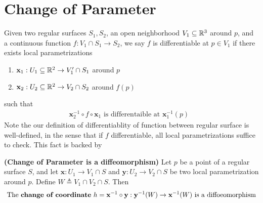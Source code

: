 \documentclass{report}
\begin{document}
\section{Change of Parameter}
\begin{mdframed}
Given two regular surfaces $S_1,S_2$, an open neighborhood $V_1\subseteq \mathbb{R}^3$ around $p$, and a continuous function  $f:V_1\cap S_1\rightarrow S_2$, we say $f$ is differentiable at $p\in V_1$ if there exists local parametrizations 
\begin{enumerate}[label=(\alph*)]
  \item $\textbf{x}_1:U_1\subseteq \mathbb{R}^2\rightarrow V_1'\cap S_1$ around $p$
  \item $\textbf{x}_2:U_2\subseteq \mathbb{R}^2 \rightarrow V_2\cap  S_2$ around $f(p)$
\end{enumerate}
such that 
\begin{align*}
\textbf{x}_2^{-1}\circ f \circ \textbf{x}_1\text{ is differentaible at $\textbf{x}_1^{-1}(p)$ }
\end{align*}
Note the our definition of differentiablity of function between regular surface is well-defined, in the sense that if $f$ differentiable, all local parametrizations suffice to check. This fact is backed by  
\end{mdframed}
\begin{theorem}
\label{CoP}
\textbf{(Change of Parameter is a diffeomorphism)} Let $p$ be a point of a regular surface $S$, and let $\textbf{x}:U_1\rightarrow V_1\cap S$ and $\textbf{y}:U_2\rightarrow V_2\cap S$ be two local parametrization around $p$. Define $W\triangleq V_1\cap V_2 \cap S$. Then 
\begin{align*}
  \text{ The \textbf{change of coordinate} $h=\textbf{x}^{-1}\circ \textbf{y}:\textbf{y}^{-1}(W)\to \textbf{x}^{-1}(W)$ is a diffoeomorphism }
\end{align*}
\end{theorem}
\end{document}

